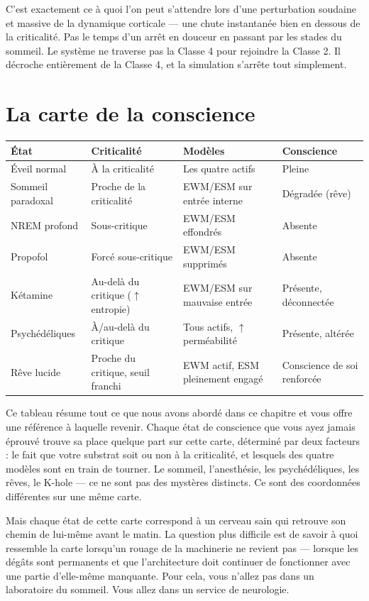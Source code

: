 \documentclass[11pt, twoside, openright]{book}
\begin{document}
C'est exactement ce à quoi l'on peut s'attendre lors d'une perturbation soudaine et massive de la dynamique corticale --- une chute instantanée bien en dessous de la criticalité. Pas le temps d'un arrêt en douceur en passant par les stades du sommeil. Le système ne traverse pas la Classe 4 pour rejoindre la Classe 2. Il décroche entièrement de la Classe 4, et la simulation s'arrête tout simplement.

\section*{La carte de la conscience}


\small
\begin{xltabular}{\linewidth}{X X X X}
\toprule
\textbf{État} & \textbf{Criticalité} & \textbf{Modèles} & \textbf{Conscience} \\
\midrule\endhead
Éveil normal & À la criticalité & Les quatre actifs & Pleine \\[4pt]
Sommeil paradoxal & Proche de la criticalité & EWM/\allowbreak{}ESM sur entrée interne & Dégradée (rêve) \\[4pt]
NREM profond & Sous-critique & EWM/\allowbreak{}ESM effondrés & Absente \\[4pt]
Propofol & Forcé sous-critique & EWM/\allowbreak{}ESM supprimés & Absente \\[4pt]
Kétamine & Au-delà du critique ($\uparrow$ entropie) & EWM/\allowbreak{}ESM sur mauvaise entrée & Présente, déconnectée \\[4pt]
Psychédéliques & À/\allowbreak{}au-delà du critique & Tous actifs, $\uparrow$ perméabilité & Présente, altérée \\[4pt]
Rêve lucide & Proche du critique, seuil franchi & EWM actif, ESM pleinement engagé & Conscience de soi renforcée \\[4pt]
\bottomrule
\end{xltabular}
\normalsize


Ce tableau résume tout ce que nous avons abordé dans ce chapitre et vous offre une référence à laquelle revenir. Chaque état de conscience que vous ayez jamais éprouvé trouve sa place quelque part sur cette carte, déterminé par deux facteurs : le fait que votre substrat soit ou non à la criticalité, et lesquels des quatre modèles sont en train de tourner. Le sommeil, l'anesthésie, les psychédéliques, les rêves, le K-hole --- ce ne sont pas des mystères distincts. Ce sont des coordonnées différentes sur une même carte.

Mais chaque état de cette carte correspond à un cerveau sain qui retrouve son chemin de lui-même avant le matin. La question plus difficile est de savoir à quoi ressemble la carte lorsqu'un rouage de la machinerie ne revient pas --- lorsque les dégâts sont permanents et que l'architecture doit continuer de fonctionner avec une partie d'elle-même manquante. Pour cela, vous n'allez pas dans un laboratoire du sommeil. Vous allez dans un service de neurologie.
\end{document}
